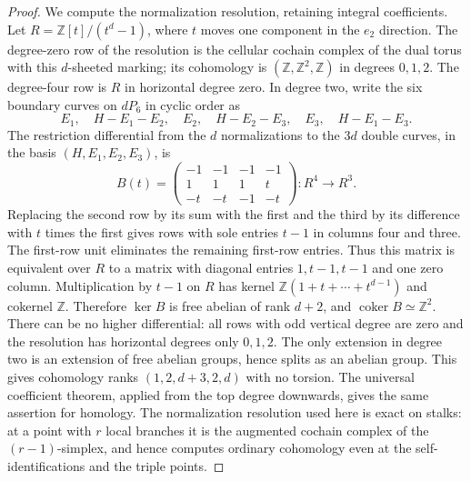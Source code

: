 \begin{proof}
We compute the normalization resolution, retaining integral coefficients.
Let $R=\mathbb Z[t]/(t^d-1)$, where $t$ moves one component in the
$e_2$ direction. The degree-zero row of the resolution is the cellular
cochain complex of the dual torus with this $d$-sheeted marking; its
cohomology is $(\mathbb Z,\mathbb Z^2,\mathbb Z)$ in degrees $0,1,2$.
The degree-four row is $R$ in horizontal degree zero. In degree two,
write the six boundary curves on $dP_6$ in cyclic order as
\[
 E_1,\quad H-E_1-E_2,\quad E_2,\quad H-E_2-E_3,
 \quad E_3,\quad H-E_1-E_3.
\]
The restriction differential from the $d$ normalizations to the $3d$
double curves, in the basis $(H,E_1,E_2,E_3)$, is
\[
 B(t)=
 \begin{pmatrix}
 -1&-1&-1&-1\\
 1&1&1&t\\
 -t&-t&-1&-t
 \end{pmatrix}:R^4\longrightarrow R^3.
\]
Replacing the second row by its sum with the first and the third by
its difference with $t$ times the first gives rows with sole entries
$t-1$ in columns four and three. The first-row unit eliminates the
remaining first-row entries. Thus this matrix is equivalent over $R$
to a matrix with diagonal entries $1,t-1,t-1$ and one zero column.
Multiplication by $t-1$ on $R$ has kernel $\mathbb Z(1+t+\cdots+t^{d-1})$
and cokernel $\mathbb Z$. Therefore $\ker B$ is free abelian of rank
$d+2$, and $\operatorname{coker}B\simeq\mathbb Z^2$.
There can be no higher differential: all rows with odd vertical degree
are zero and the resolution has horizontal degrees only $0,1,2$.
The only extension in degree two is an extension of free abelian
groups, hence splits as an abelian group. This gives cohomology ranks
$(1,2,d+3,2,d)$ with no torsion. The universal coefficient theorem,
applied from the top degree downwards, gives the same assertion for
homology. The normalization resolution used here is exact on stalks:
at a point with $r$ local branches it is the augmented cochain complex
of the $(r-1)$-simplex, and hence computes ordinary cohomology even at
the self-identifications and the triple points.
\end{proof}


